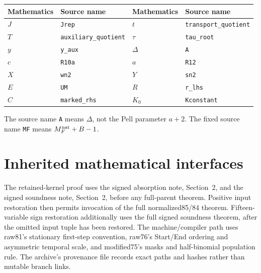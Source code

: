 \documentclass[11pt]{article}
\theoremstyle{remark}\newtheorem{remark}[theorem]{Remark}
\begin{document}
\begin{center}\small
\begin{tabular}{ll@{\qquad}ll}
\toprule
Mathematics & Source name & Mathematics & Source name\\
\midrule
$J$&\texttt{Jrep}&$t$&\texttt{transport\_quotient}\\
$T$&\texttt{auxiliary\_quotient}&$\tau$&\texttt{tau\_root}\\
$y$&\texttt{y\_aux}&$\Delta$&\texttt{A}\\
$c$&\texttt{R10a}&$a$&\texttt{R12}\\
$X$&\texttt{wn2}&$Y$&\texttt{sn2}\\
$E$&\texttt{UM}&$R$&\texttt{r\_lhs}\\
$C$&\texttt{marked\_rhs}&$K_0$&\texttt{Kconstant}\\
\bottomrule
\end{tabular}\end{center}
The source name \texttt{A} means $\Delta$, not the Pell parameter $a+2$. The fixed source name \texttt{MF} means $M_F^{\rm nat}+B-1$.

\section{Inherited mathematical interfaces}

The retained-kernel proof uses the signed absorption note, Section~2, and the signed soundness note, Section~2, before any full-parent theorem. Positive input restoration then permits invocation of the full normalized85/84 theorem. Fifteen-variable sign restoration additionally uses the full signed soundness theorem, after the omitted input tuple has been restored. The machine/compiler path uses raw81's stationary first-step convention, raw76's Start/End ordering and asymmetric temporal scale, and modified75's masks and half-binomial population rule. The archive's provenance file records exact paths and hashes rather than mutable branch links.
\end{document}
